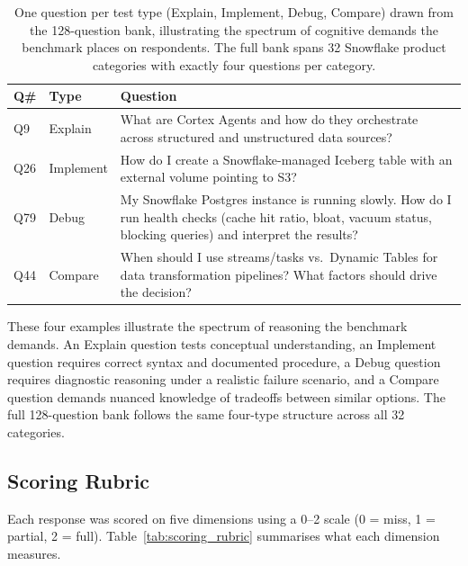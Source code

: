 \documentclass[10pt,letterpaper]{article}
\begin{document}
\begin{table}[tbp]
\caption{One question per test type (Explain, Implement, Debug, Compare) drawn from the 128-question bank, illustrating the spectrum of cognitive demands the benchmark places on respondents. The full bank spans 32 Snowflake product categories with exactly four questions per category.}
\label{tab:question_bank}
\small
\begin{tabularx}{\linewidth}{@{}l l X@{}}
\toprule
\textbf{Q\#} & \textbf{Type} & \textbf{Question} \\
\midrule
Q9  & Explain   & What are Cortex Agents and how do they orchestrate across structured and unstructured data sources? \\[4pt]
Q26 & Implement & How do I create a Snowflake-managed Iceberg table with an external volume pointing to S3? \\[4pt]
Q79 & Debug     & My Snowflake Postgres instance is running slowly. How do I run health checks (cache hit ratio, bloat, vacuum status, blocking queries) and interpret the results? \\[4pt]
Q44 & Compare   & When should I use streams/tasks vs.\ Dynamic Tables for data transformation pipelines? What factors should drive the decision? \\
\bottomrule
\end{tabularx}
\end{table}

These four examples illustrate the spectrum of reasoning the benchmark demands. An Explain question tests conceptual understanding, an Implement question requires correct syntax and documented procedure, a Debug question requires diagnostic reasoning under a realistic failure scenario, and a Compare question demands nuanced knowledge of tradeoffs between similar options. The full 128-question bank follows the same four-type structure across all 32 categories.

\subsection{Scoring Rubric}

Each response was scored on five dimensions using a 0--2 scale (0 = miss, 1 = partial, 2 = full). Table~\ref{tab:scoring_rubric} summarises what each dimension measures.
\end{document}
